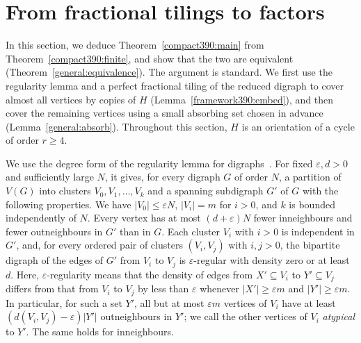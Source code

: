 \section{From fractional tilings to factors}\label{factor402:section}
In this section, we deduce Theorem~\ref{compact390:main} from Theorem~\ref{compact390:finite}, and show that the two are equivalent (Theorem~\ref{general:equivalence}). The argument is standard. We first use the regularity lemma and a perfect fractional tiling of the reduced digraph to cover almost all vertices by copies of $H$ (Lemma~\ref{framework390:embed}), and then cover the remaining vertices using a small absorbing set chosen in advance (Lemma~\ref{general:absorb}).
Throughout this section, $H$ is an orientation of a cycle of order $r\ge4$.

We use the degree form of the regularity lemma for digraphs~\cite{AS}. For fixed $\varepsilon,d>0$ and sufficiently large $N$, it gives, for every digraph $G$ of order $N$, a partition of $V(G)$ into clusters $V_0,V_1,\ldots,V_k$ and a spanning subdigraph $G'$ of $G$ with the following properties. We have $|V_0|\le\varepsilon N$, $|V_i|=m$ for $i>0$, and $k$ is bounded independently of $N$. Every vertex has at most
$(d+\varepsilon)N$ fewer inneighbours and fewer outneighbours in $G'$ than in $G$. Each cluster $V_i$ with $i>0$ is independent in $G'$, and, for every ordered pair of clusters $(V_i,V_j)$ with $i,j>0$, the bipartite digraph of the edges of $G'$ from $V_i$ to $V_j$ is
$\varepsilon$-regular with density zero or at least $d$.
Here, $\varepsilon$-regularity means that the density of edges from $X'\subseteq V_i$ to $Y'\subseteq V_j$ differs from that from $V_i$ to $V_j$ by less than $\varepsilon$ whenever $|X'|\ge\varepsilon m$ and $|Y'|\ge\varepsilon m$. In particular, for such a set $Y'$, all but at most $\varepsilon m$ vertices of $V_i$ have at least $(d(V_i,V_j)-\varepsilon)|Y'|$ outneighbours in $Y'$; we call the other vertices of $V_i$ \emph{atypical} to $Y'$. The same holds for inneighbours.

